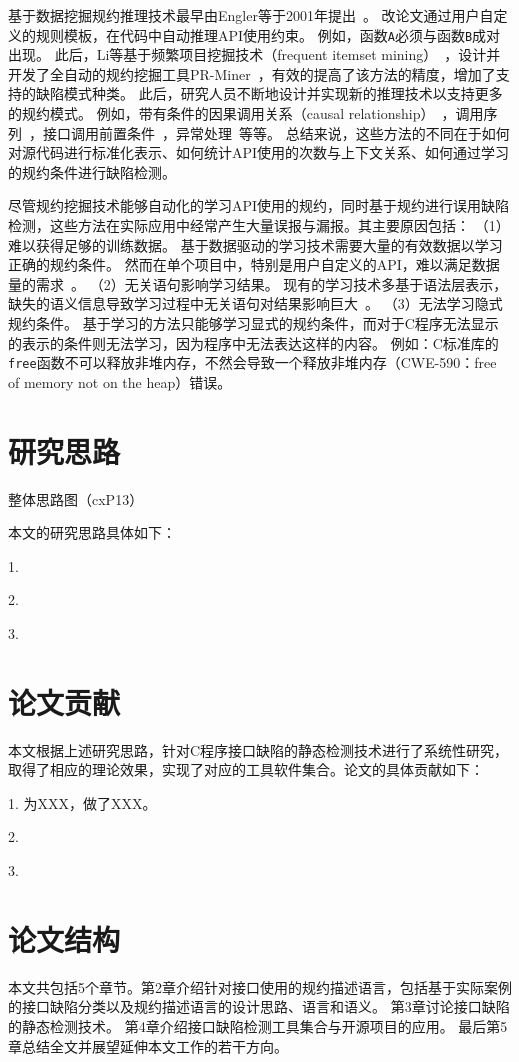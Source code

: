 基于数据挖掘规约推理技术最早由Engler等于2001年提出~\cite{01-sosp-mining}。
改论文通过用户自定义的规则模板，在代码中自动推理API使用约束。
例如，函数\texttt{A}必须与函数\texttt{B}成对出现。
此后，Li等基于频繁项目挖掘技术（frequent itemset mining）~\cite{03-fimi-frequent}，设计并开发了全自动的规约挖掘工具PR-Miner~\cite{05-fse-prminer}，有效的提高了该方法的精度，增加了支持的缺陷模式种类。
此后，研究人员不断地设计并实现新的推理技术以支持更多的规约模式。
例如，带有条件的因果调用关系（causal relationship）~\cite{07-fse-temporal}，调用序列~\cite{09-ase-sequence}，接口调用前置条件~\cite{14-fse-pre}，异常处理~\cite{16-ase-apex}等等。
总结来说，这些方法的不同在于如何对源代码进行标准化表示、如何统计API使用的次数与上下文关系、如何通过学习的规约条件进行缺陷检测。

尽管规约挖掘技术能够自动化的学习API使用的规约，同时基于规约进行误用缺陷检测，这些方法在实际应用中经常产生大量误报与漏报。其主要原因包括：
（1）难以获得足够的训练数据。
基于数据驱动的学习技术需要大量的有效数据以学习正确的规约条件。
然而在单个项目中，特别是用户自定义的API，难以满足数据量的需求~\cite{15-kernel-sv,survey18}。
（2）无关语句影响学习结果。
现有的学习技术多基于语法层表示，缺失的语义信息导致学习过程中无关语句对结果影响巨大~\cite{16-icse-antminer}。
（3）无法学习隐式规约条件。
基于学习的方法只能够学习显式的规约条件，而对于C程序无法显示的表示的条件则无法学习，因为程序中无法表达这样的内容。
例如：C标准库的\texttt{free}函数不可以释放非堆内存，不然会导致一个释放非堆内存（CWE-590：free of memory not on the heap）错误。


\section{研究思路}
整体思路图（cxP13）

本文的研究思路具体如下：

1.

2.

3.



\section{论文贡献}
本文根据上述研究思路，针对C程序接口缺陷的静态检测技术进行了系统性研究，取得了相应的理论效果，实现了对应的工具软件集合。论文的具体贡献如下：

1. 为XXX，做了XXX。

2.

3.
\section{论文结构}
本文共包括5个章节。第2章介绍针对接口使用的规约描述语言，包括基于实际案例的接口缺陷分类以及规约描述语言的设计思路、语言和语义。
第3章讨论接口缺陷的静态检测技术。
第4章介绍接口缺陷检测工具集合与开源项目的应用。
最后第5章总结全文并展望延伸本文工作的若干方向。
